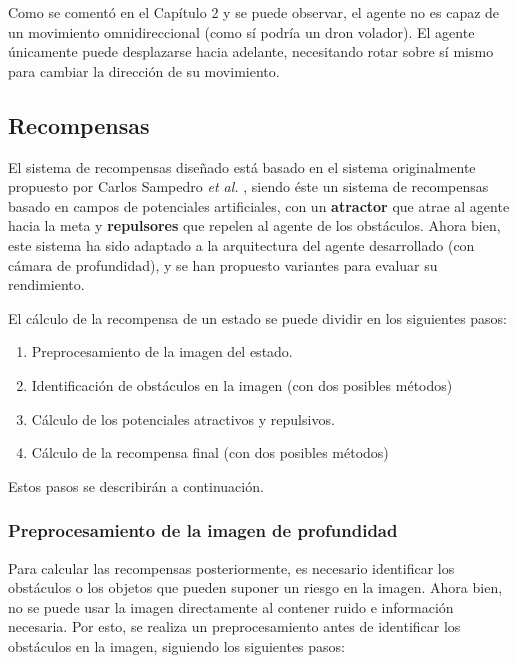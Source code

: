 Como se comentó en el Capítulo 2 y se puede observar, el agente no es capaz de un movimiento omnidireccional (como sí podría un dron volador). El agente únicamente puede desplazarse hacia adelante, necesitando rotar sobre sí mismo para cambiar la dirección de su movimiento.

\subsection{Recompensas}

El sistema de recompensas diseñado está basado en el sistema originalmente propuesto por Carlos Sampedro \textit{et al.} \cite{Sampedro2018}, siendo éste un sistema de recompensas basado en campos de potenciales artificiales, con un \textbf{atractor} que atrae al agente hacia la meta y \textbf{repulsores} que repelen al agente de los obstáculos. Ahora bien, este sistema ha sido adaptado a la arquitectura del agente desarrollado (con cámara de profundidad), y se han propuesto variantes para evaluar su rendimiento.

El cálculo de la recompensa de un estado se puede dividir en los siguientes pasos:
\begin{enumerate}
	\item Preprocesamiento de la imagen del estado.
	\item Identificación de obstáculos en la imagen (con dos posibles métodos)
	\item Cálculo de los potenciales atractivos y repulsivos.
	\item Cálculo de la recompensa final (con dos posibles métodos)
\end{enumerate}

Estos pasos se describirán a continuación.

\subsubsection{Preprocesamiento de la imagen de profundidad}

Para calcular las recompensas posteriormente, es necesario identificar los obstáculos o los objetos que pueden suponer un riesgo en la imagen. Ahora bien, no se puede usar la imagen directamente al contener ruido e información necesaria. Por esto, se realiza un preprocesamiento antes de identificar los obstáculos en la imagen, siguiendo los siguientes pasos:

